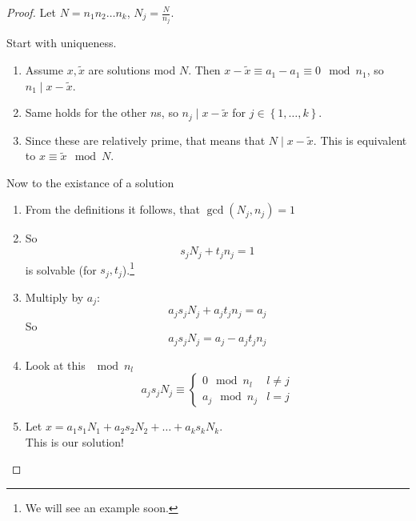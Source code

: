 \documentclass[english]{lbscript}
\begin{document}
\begin{proof}
  Let \(N=n_1 n_2 \dots n_k\), \(N_j=\frac{N}{n_j}\).

  Start with uniqueness.
  \begin{enumerate}
    \item\label{item:67} Assume \(x, \tilde{x}\) are solutions mod \(N\). Then \(x-\tilde{x}≡a_1-a_1 ≡0 \mod n_1\), so \(n_1 \mid x-\tilde{x}\).
    \item\label{item:68} Same holds for the other \(n\)s, so \(n_j \mid x-\tilde{x}\) for \(j∈\left\{ 1, \dots, k \right\} \).
    \item\label{item:69} Since these are relatively prime, that means that \(N \mid x - \tilde{x}\). This is equivalent to \(x≡\tilde{x} \mod N\).
  \end{enumerate}

  Now to the existance of a solution
  \begin{enumerate}
    \item\label{item:70} From the definitions it follows, that \(\gcd(N_j, n_j)=1\)
    \item\label{item:71} So
    \begin{equation}
      \label{eq:121}
      s_j N_j + t_j n_j = 1
    \end{equation}
    is solvable (for \(s_j, t_j\)).\footnote{We will see an example soon.}
    \item\label{item:72} Multiply by \(a_j\):
    \begin{equation}
      \label{eq:122}
      a_j s_j N_j + a_j t_j n_j = a_j
    \end{equation}
    So
    \begin{equation}
      \label{eq:123}
      a_j s_j N_j = a_j - a_j t_j n_j
    \end{equation}
    \item\label{item:73} Look at this \(\mod n_l\)
    \begin{equation}
      \label{eq:124}
      a_j s_j N_j ≡
      \begin{cases}
        0 \mod n_{l} & l≠j \\ a_j \mod n_j & l=j
      \end{cases}
    \end{equation}
    \item\label{item:74} Let \(x=a_1s_1N_1+a_2s_2N_2+\dots+a_k s_k N_k\). \\
    This is our solution!
  \end{enumerate}
\end{proof}
\end{document}
